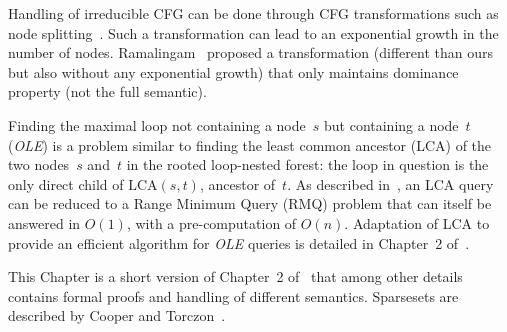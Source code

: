 Handling of irreducible CFG can be done through CFG transformations such as node splitting~\cite{JC97,aho86compilers}.
Such a transformation can lead to an exponential growth in the number of nodes.
Ramalingam~\cite{Ramalingam:2002:TOPLAS} proposed a transformation (different than ours but also without any exponential growth) that only maintains dominance property (not the full semantic).

Finding the maximal loop not containing a node~$s$ but containing a node~$t$ (\textit{OLE}) is a problem similar to finding the least common ancestor (LCA) of the two nodes~$s$ and~$t$ in the rooted loop-nested forest:
the loop in question is the only direct child of $\textrm{LCA}(s,t)$, ancestor of~$t$.
As described in~\cite{BenderFC00}, an LCA query can be reduced to a Range Minimum Query (RMQ) problem that can itself be answered in $O(1)$, with a pre-computation of $O(n)$.
Adaptation of LCA to provide an efficient algorithm for \textit{OLE} queries is detailed in Chapter~2 of~\cite{rastello-hab}.

This Chapter is a short version of Chapter~2 of~\cite{rastello-hab} that among other details contains formal proofs and handling of different \phifun semantics. Sparsesets are described by Cooper and Torczon~\cite{cooper:2004:engineering}.

